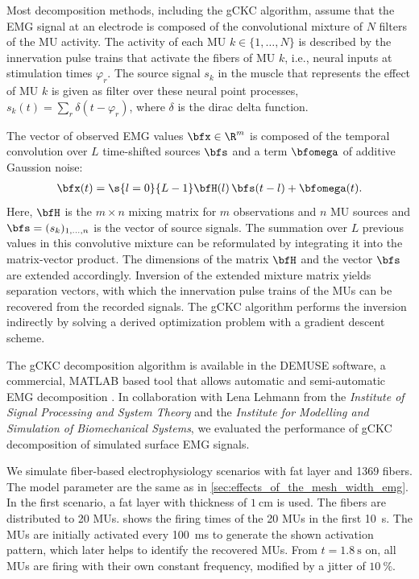 Most decomposition methods, including the gCKC algorithm, assume that the EMG signal at an electrode is composed of the convolutional mixture of $N$ filters of the MU activity. 
The activity of each MU $k\in \{1,\dots,N\}$ is described by the innervation pulse trains that activate the fibers of MU $k$, i.e., neural inputs at stimulation times $\varphi_r$. The source signal $s_k$ in the muscle that represents the effect of MU $k$ is given as filter over these neural point processes, $s_k(t) = \sum_r\delta(t - \varphi_r)$, where $\delta$ is the dirac delta function.

The vector of observed EMG values $\bfx \in \R^m$ is composed of the temporal convolution over $L$ time-shifted sources $\bfs$ and a term $\bfomega$ of additive Gaussion noise:
\begin{align*}
  \bfx(t) = \s{l=0}{L-1}\bfH(l)\,\bfs(t-l) + \bfomega(t).
\end{align*}
Here, $\bfH$ is the $m\times n$ mixing matrix for $m$ observations and $n$ MU sources and $\bfs = (s_k)_{1,\dots,n}$ is the vector of source signals. The summation over $L$ previous values in this convolutive mixture can be reformulated by integrating it into the matrix-vector product. The dimensions of the matrix $\bfH$ and the vector $\bfs$ are extended accordingly. Inversion of the extended mixture matrix yields separation vectors, with which the innervation pulse trains of the MUs can be recovered from the recorded signals. The gCKC algorithm performs the inversion indirectly by solving a derived optimization problem with a gradient descent scheme.

The gCKC decomposition algorithm is available in the DEMUSE software, a commercial, MATLAB based tool that allows automatic and semi-automatic EMG decomposition \cite{demuse}. In collaboration with Lena Lehmann from the \emph{Institute of Signal Processing and System Theory} and the \emph{Institute for Modelling and Simulation of Biomechanical Systems}, we evaluated the performance of gCKC decomposition of simulated surface EMG signals.

We simulate fiber-based electrophysiology scenarios with fat layer and 1369 fibers. The model parameter are the same as in \cref{sec:effects_of_the_mesh_width_emg}. In the first scenario, a fat layer with thickness of $\SI{1}{\cm}$ is used. The fibers are distributed to 20 MUs.
 shows the firing times of the 20 MUs in the first \SI{10}{\second}. The MUs are initially activated every \SI{100}{\ms} to generate the shown  activation pattern, which later helps to identify the recovered MUs.  From $t=\SI{1.8}{\second}$ on, all MUs are firing with their own constant frequency, modified by a jitter of $\SI{10}{\percent}$.

